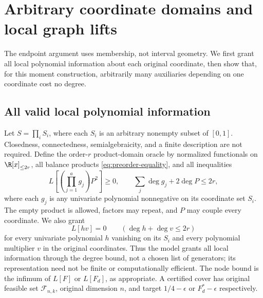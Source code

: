 \section{Arbitrary coordinate domains and local graph lifts}
\label{sec:coordinate-domains}
The endpoint argument uses membership, not interval geometry. We first
grant all local polynomial information about each original coordinate,
then show that, for this moment construction, arbitrarily many
auxiliaries depending on one coordinate cost no degree.

\subsection{All valid local polynomial information}
Let $S=\prod_i S_i$, where each $S_i$ is an arbitrary nonempty subset of
$[0,1]$. Closedness, connectedness, semialgebraicity, and a finite description
are not required. Define the order-$r$ product-domain oracle by normalized
functionals on $\R[x]_{\le2r}$, all balance products
\eqref{eq:preorder-equality}, and all inequalities
\begin{equation}\label{eq:product-domain-oracle}
 L\left[\left(\prod_{j=1}^a g_j\right)P^2\right]\ge0,
 \qquad\sum_j\deg g_j+2\deg P\le2r,
\end{equation}
where each $g_j$ is any univariate polynomial nonnegative on its
coordinate set $S_i$. The empty product is allowed, factors may repeat,
and $P$ may couple every coordinate. We also grant
\begin{equation}\label{eq:product-domain-equalities}
 L[h v]=0\qquad(\deg h+\deg v\le2r)
\end{equation}
for every univariate polynomial $h$ vanishing on its $S_i$ and every
polynomial multiplier $v$ in the original coordinates. Thus the model
grants all local information through the degree bound, not a chosen
list of generators; its representation need not be finite or
computationally efficient. The node bound is the infimum of $L[F]$ or
$L[F_d]$, as appropriate. A certified cover has original feasible set
$\mathcal F_{n,k}$, original dimension $n$, and target
$1/4-\epsilon$ or $F_d^*-\epsilon$ respectively.

